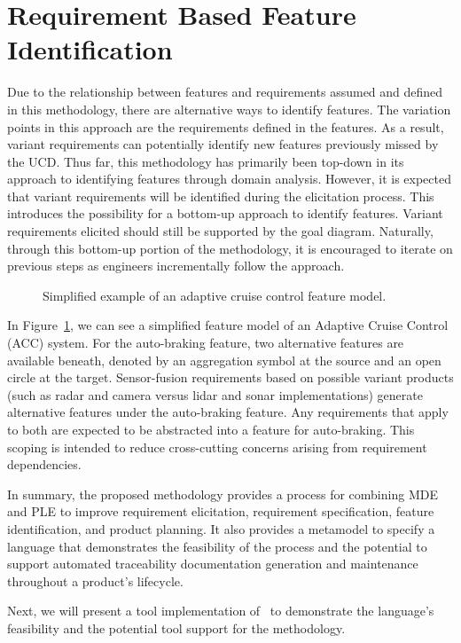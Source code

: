 \section{Requirement Based Feature Identification}

Due to the relationship between features and requirements assumed and defined in this methodology, there are alternative ways to identify features. The variation points in this approach are the requirements defined in the features. As a result, variant requirements can potentially identify new features previously missed by the \gls{UCD}. Thus far, this methodology has primarily been top-down in its approach to identifying features through domain analysis. However, it is expected that variant requirements will be identified during the elicitation process. This introduces the possibility for a bottom-up approach to identify features. Variant requirements elicited should still be supported by the goal diagram. Naturally, through this bottom-up portion of the methodology, it is encouraged to iterate on previous steps as engineers incrementally follow the approach.

\begin{figure}
	\centering
	
	\caption{Simplified example of an adaptive cruise control feature model.}
	\label{fig:acc_fm}
\end{figure}

In Figure~\ref{fig:acc_fm}, we can see a simplified feature model of an Adaptive Cruise Control (ACC) system. For the auto-braking feature, two alternative features are available beneath, denoted by an aggregation symbol at the source and an open circle at the target. Sensor-fusion requirements based on possible variant products (such as radar and camera versus lidar and sonar implementations) generate alternative features under the auto-braking feature. Any requirements that apply to both are expected to be abstracted into a feature for auto-braking. This scoping is intended to reduce cross-cutting concerns arising from requirement dependencies.

In summary, the proposed methodology provides a process for combining \gls{MDE} and \gls{PLE} to improve requirement elicitation, requirement specification, feature identification, and product planning. It also provides a metamodel to specify a language that demonstrates the feasibility of the process and the potential to support automated traceability documentation generation and maintenance throughout a product's lifecycle. 

Next, we will present a tool implementation of \tool\ to demonstrate the language's feasibility and the potential tool support for the methodology.




